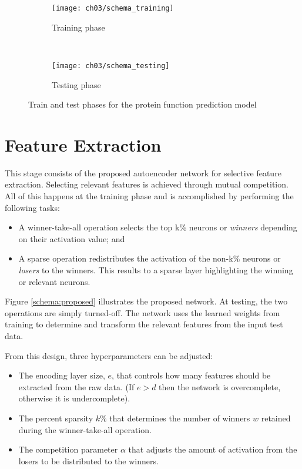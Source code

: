 \begin{figure}[h]
    \centering
    \begin{subfigure}[b]{0.8\textwidth}
        \texttt{[image: ch03/schema\_training]}
        \caption{Training phase}
        \label{schema:training}
    \end{subfigure}
    ~ %
    \begin{subfigure}[b]{0.9\textwidth}
        \texttt{[image: ch03/schema\_testing]}
        \caption{Testing phase}
        \label{schema:testing}
    \end{subfigure}
    \caption{Train and test phases for the protein function prediction model}
    \label{schema:training_testing}
\end{figure}

\section{Feature Extraction}
\label{FeatureExtraction}

\par This stage consists of the proposed autoencoder network for selective
feature extraction. Selecting relevant features is achieved through mutual
competition. All of this happens at the training phase and is accomplished
by performing the following tasks:

\begin{itemize}
    \item A winner-take-all operation selects the top k\% neurons or 
        \textit{winners} depending on their activation value; and
    \item A sparse operation redistributes the activation of the non-k\%
        neurons or \textit{losers} to the winners. This results to a sparse
        layer highlighting the winning or relevant neurons.
\end{itemize}

\noindent  Figure \ref{schema:proposed} illustrates the proposed network.
At testing, the two operations are simply turned-off. The network uses the
learned weights from training to determine and transform the relevant features
from the input test data.

\par From this design, three hyperparameters can be adjusted:

\begin{itemize}
    \item The encoding layer size, $e$, that controls how many features
        should be extracted from the raw data. (If $e>d$ then the network is
        overcomplete, otherwise it is undercomplete).
    \item The percent sparsity $k\%$ that determines the number of winners $w$
        retained during the winner-take-all operation.
    \item The competition parameter $\alpha$ that adjusts the amount of activation
        from the losers to be distributed to the winners.
\end{itemize}

